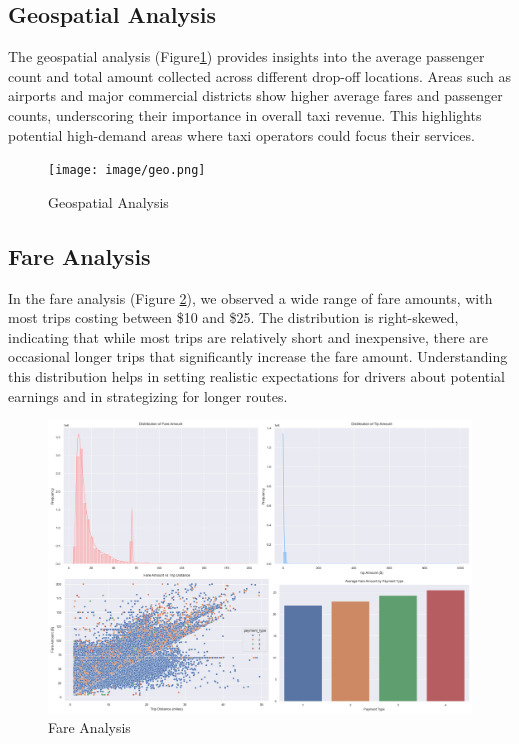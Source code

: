 \documentclass[11pt]{article}
\begin{document}
\subsection{Geospatial Analysis}
The geospatial analysis (Figure\ref{fig:2}) provides insights into the average passenger count and total amount collected across different drop-off locations. Areas such as airports and major commercial districts show higher average fares and passenger counts, underscoring their importance in overall taxi revenue. This highlights potential high-demand areas where taxi operators could focus their services.\cite{urbanmobility2018}

\begin{figure}[h]
    \texttt{[image: image/geo.png]}
    \centering
    \caption{Geospatial Analysis} %
    \label{fig:2}
    
\end{figure}


\subsection{Fare Analysis}
In the fare analysis (Figure \ref{fig:3}), we observed a wide range of fare amounts, with most trips costing between \$10 and \$25. The distribution is right-skewed, indicating that while most trips are relatively short and inexpensive, there are occasional longer trips that significantly increase the fare amount. Understanding this distribution helps in setting realistic expectations for drivers about potential earnings and in strategizing for longer routes. 

\begin{figure}[h]
    \includegraphics[width=.85\textwidth]{image/fare.png}
    \centering
    \caption{Fare Analysis} %
    \label{fig:3}
    
\end{figure}
\end{document}
